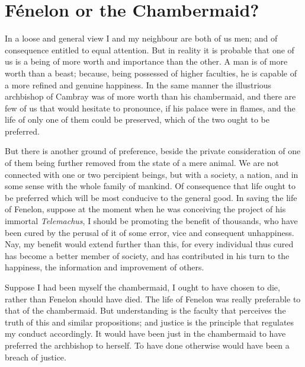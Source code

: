 
\author{William Godwin}
\chapter{F\'enelon or the Chambermaid?}

\noindent In a loose and general view I and my neighbour are
both of us men; and of consequence entitled to equal attention. But in
reality it is probable that one of us is a being of more worth and
importance than the other. A man is of more worth than a beast;
because, being possessed of higher faculties, he is capable of a more
refined and genuine happiness. In the same manner  the
illustrious archbishop of Cambray was of more worth than his
chambermaid, and there are few of us that would hesitate to pronounce,
if his palace were in flames, and the life of only one of them could
be preserved, which of the two ought to be preferred.

But there is another ground of preference, beside the private
consideration of one of them being further removed from the state of a
mere animal. We are not connected with one or two percipient beings,
but with a society, a nation, and in some sense with the whole family
of mankind. Of consequence that life ought to be preferred which will
be most conducive to the general good. In saving the life of Fenelon,
suppose at the moment when he was conceiving the project of his
immortal \textit{Telemachus}, I should be promoting the benefit of
thousands, who have been cured by the perusal of it of some error,
vice and consequent unhappiness. Nay, my benefit would extend further
than this, for every individual thus cured has become a better member
of society, and has contributed in his turn to the happiness, the
information and improvement of others.

Suppose I had been myself the chambermaid, I ought to have chosen to
die, rather than Fenelon should have died. The life of Fenelon was
really preferable to that of the chambermaid. But understanding is the
faculty that perceives the truth of this and similar propositions; and
justice is the principle that  regulates my conduct
accordingly. It would have been just in the chambermaid to have
preferred the archbishop to herself. To have done otherwise would have
been a breach of justice.

